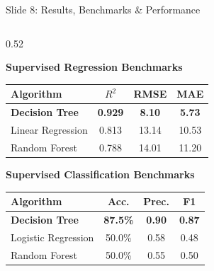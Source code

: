 \documentclass[10pt, aspectratio=169]{beamer}
\begin{document}
\begin{frame}{Slide 8: Results, Benchmarks \& Performance}
    \begin{columns}[T]
        \begin{column}{0.52\textwidth}
            \begin{block}{\textbf{Supervised Regression Benchmarks}}
                \vspace{0.05cm}
                \centering
                \scriptsize
                \begin{tabular}{@{}lccc@{}}
                    \toprule
                    \textbf{Algorithm} & \textbf{$R^2$} & \textbf{RMSE} & \textbf{MAE} \\ \midrule
                    \textbf{Decision Tree} & \textbf{0.929} & \textbf{8.10} & \textbf{5.73} \\
                    Linear Regression & 0.813 & 13.14 & 10.53 \\
                    Random Forest & 0.788 & 14.01 & 11.20 \\ \bottomrule
                \end{tabular}
                \vspace{0.05cm}
            \end{block}
            \vspace{0.15cm}
            \begin{block}{\textbf{Supervised Classification Benchmarks}}
                \vspace{0.05cm}
                \centering
                \scriptsize
                \begin{tabular}{@{}lccc@{}}
                    \toprule
                    \textbf{Algorithm} & \textbf{Acc.} & \textbf{Prec.} & \textbf{F1} \\ \midrule
                    \textbf{Decision Tree} & \textbf{87.5\%} & \textbf{0.90} & \textbf{0.87} \\
                    Logistic Regression & 50.0\% & 0.58 & 0.48 \\
                    Random Forest & 50.0\% & 0.55 & 0.50 \\ \bottomrule
                \end{tabular}
                \vspace{0.05cm}
            \end{block}

\end{column}
\end{columns}
\end{frame}
\end{document}
